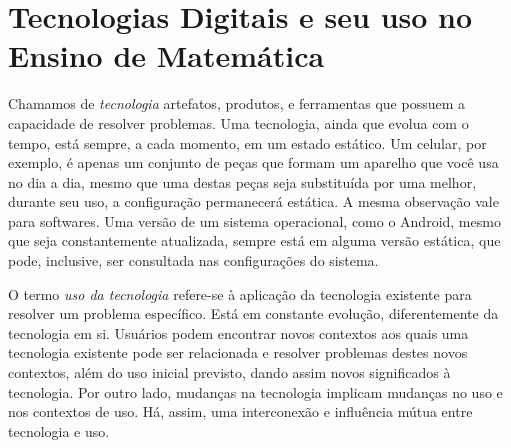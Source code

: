 \chapter{Tecnologias Digitais e seu uso no Ensino de Matemática}
\label{cap:recComputacionais}



Chamamos de \textit{tecnologia} artefatos, produtos, e ferramentas que possuem a capacidade de resolver problemas. Uma tecnologia, ainda que evolua com o tempo, está sempre, a cada momento, em um estado estático. Um celular, por exemplo, é apenas um conjunto de peças que formam um aparelho que você usa no dia a dia, mesmo que uma destas peças seja substituída por uma melhor, durante seu uso, a configuração permanecerá estática. A mesma observação vale para softwares. Uma versão de um sistema operacional, como o Android, mesmo que seja constantemente atualizada, sempre está em alguma versão estática, que pode, inclusive, ser consultada nas configurações do sistema.

O termo \textit{uso da tecnologia} refere-se à aplicação da tecnologia existente para resolver um problema específico. Está em constante evolução, diferentemente da tecnologia em si. Usuários podem encontrar novos contextos aos quais uma tecnologia existente pode ser relacionada e resolver problemas destes novos contextos, além do uso inicial previsto, dando assim novos significados à tecnologia. Por outro lado, mudanças na tecnologia implicam mudanças no uso e nos contextos de uso. Há, assim, uma interconexão e influência mútua entre tecnologia e uso.
\\


